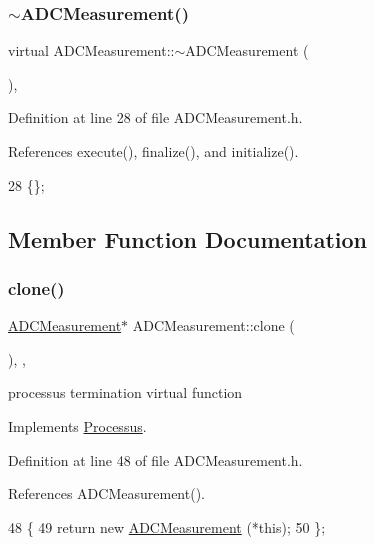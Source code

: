 \subsubsection{\texorpdfstring{$\sim$\+A\+D\+C\+Measurement()}{~ADCMeasurement()}}
{\footnotesize\ttfamily virtual A\+D\+C\+Measurement\+::$\sim$\+A\+D\+C\+Measurement (\begin{DoxyParamCaption}{ }\end{DoxyParamCaption})\hspace{0.3cm}{\ttfamily [inline]}, {\ttfamily [virtual]}}



Definition at line 28 of file A\+D\+C\+Measurement.\+h.



References execute(), finalize(), and initialize().


\begin{DoxyCode}
28 \{\}; 
\end{DoxyCode}


\subsection{Member Function Documentation}
\mbox{\label{classADCMeasurement_a6e34c2b4e3451f1fd128d213723ab1b9}} 
\subsubsection{\texorpdfstring{clone()}{clone()}}
{\footnotesize\ttfamily \hyperlink{classADCMeasurement}{A\+D\+C\+Measurement}$\ast$ A\+D\+C\+Measurement\+::clone (\begin{DoxyParamCaption}{ }\end{DoxyParamCaption})\hspace{0.3cm}{\ttfamily [inline]}, {\ttfamily [protected]}, {\ttfamily [virtual]}}

processus termination virtual function 

Implements \hyperlink{classProcessus_aca8856f6d6d7b7e1fe941f298dcbb502}{Processus}.



Definition at line 48 of file A\+D\+C\+Measurement.\+h.



References A\+D\+C\+Measurement().


\begin{DoxyCode}
48                          \{
49     \textcolor{keywordflow}{return} \textcolor{keyword}{new} \hyperlink{classADCMeasurement_a93804f658f3aaa78d3ce18199f1bf8e1}{ADCMeasurement} (*\textcolor{keyword}{this});
50   \};
\end{DoxyCode}
\mbox{\label{classADCMeasurement_a82de69f0488646dfc50d28f611e2010d}} 
